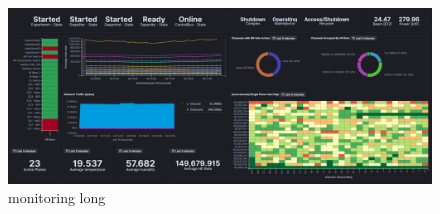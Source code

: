 \begin{figure} %
    \includegraphics[width=\textwidth]{diagrams/5-daq/monitoring.pdf}
    \caption[monitoring short]
    {monitoring long}
    \label{fig:monitoring}
\end{figure}